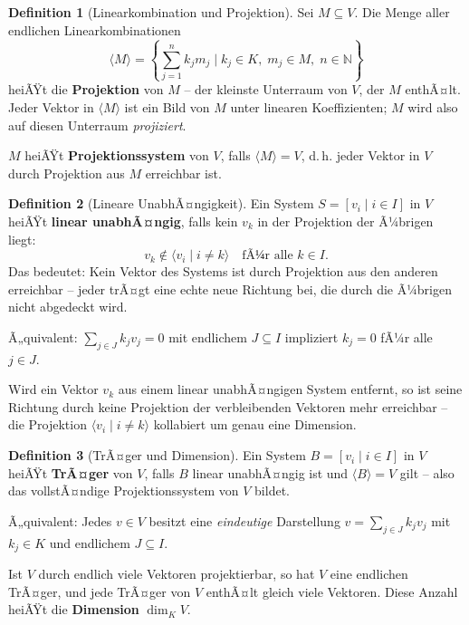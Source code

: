 ﻿\documentclass[a4paper,12pt]{report}
\theoremstyle{definition}
\newtheorem{definition}{Definition}
\begin{document}
\begin{definition}[Linearkombination und Projektion]
    Sei $M \subseteq V$. Die Menge aller endlichen Linearkombinationen
    \[
        \langle M \rangle = \left\{ \sum_{j=1}^{n} k_j m_j \;\Big|\;
        k_j \in K,\; m_j \in M,\; n \in \mathbb{N} \right\}
    \]
    heiÃŸt die \textbf{Projektion} von $M$ -- der kleinste Unterraum
    von $V$, der $M$ enthÃ¤lt. Jeder Vektor in $\langle M \rangle$ ist
    ein Bild von $M$ unter linearen Koeffizienten; $M$ wird also auf
    diesen Unterraum \emph{projiziert}.

    $M$ heiÃŸt \textbf{Projektionssystem} von $V$, falls $\langle M \rangle = V$,
    d.\,h. jeder Vektor in $V$ durch Projektion aus $M$ erreichbar ist.
\end{definition}

\begin{definition}[Lineare UnabhÃ¤ngigkeit]
    Ein System $S = [v_i \mid i \in I]$ in $V$ heiÃŸt \textbf{linear unabhÃ¤ngig},
    falls kein $v_k$ in der Projektion der Ã¼brigen liegt:
    \[
        v_k \notin \langle v_i \mid i \neq k \rangle \quad \text{fÃ¼r alle } k \in I.
    \]
    Das bedeutet: Kein Vektor des Systems ist durch Projektion aus den
    anderen erreichbar -- jeder trÃ¤gt eine echte neue Richtung bei, die
    durch die Ã¼brigen nicht abgedeckt wird.

    Ã„quivalent: $\sum_{j \in J} k_j v_j = 0$ mit endlichem $J \subseteq I$
    impliziert $k_j = 0$ fÃ¼r alle $j \in J$.

    Wird ein Vektor $v_k$ aus einem linear unabhÃ¤ngigen System entfernt,
    so ist seine Richtung durch keine Projektion der verbleibenden Vektoren
    mehr erreichbar -- die Projektion $\langle v_i \mid i \neq k \rangle$
    kollabiert um genau eine Dimension.
\end{definition}

\begin{definition}[TrÃ¤ger und Dimension]
    Ein System $B = [v_i \mid i \in I]$ in $V$ heiÃŸt \textbf{TrÃ¤ger} von $V$,
    falls $B$ linear unabhÃ¤ngig ist und $\langle B \rangle = V$ gilt --
    also das vollstÃ¤ndige Projektionssystem von $V$ bildet.

    Ã„quivalent: Jedes $v \in V$ besitzt eine \emph{eindeutige} Darstellung
    $v = \sum_{j \in J} k_j v_j$ mit $k_j \in K$ und endlichem $J \subseteq I$.

    Ist $V$ durch endlich viele Vektoren projektierbar, so hat $V$ eine
    endlichen TrÃ¤ger, und jede TrÃ¤ger von $V$ enthÃ¤lt gleich viele Vektoren.
    Diese Anzahl heiÃŸt die \textbf{Dimension} $\dim_K V$.
\end{definition}
\end{document}
